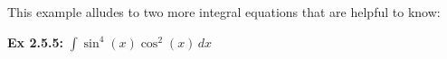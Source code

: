 This example alludes to two more integral equations that are helpful to know: \par


\begin{tcolorbox}[example]
    \textbf{Ex 2.5.5: } $\int \sin^4 (x)\cos^2 (x) \, dx$
\end{tcolorbox} 
